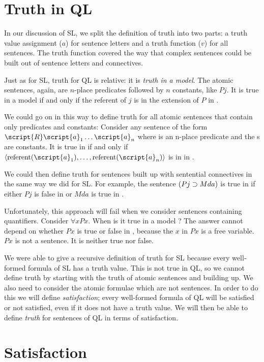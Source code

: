 \section{Truth in QL}
\label{sec.TruthInQL}
In our discussion of SL, we split the definition of truth into two parts: a truth value assignment ($a$) for sentence letters and a truth function ($v$) for all sentences. The truth function covered the way that complex sentences could be built out of sentence letters and connectives.

Just as for SL, truth for QL is relative: it is \emph{truth in a model}. The atomic sentences, again, are $n$-place predicates followed by $n$ constants, like $Pj$. It is true in a model  if and only if the referent of $j$ is in the extension of $P$ in .

We could go on in this way to define truth for all atomic sentences that contain only predicates and constants: Consider any sentence of the form $\script{R}\script{a}_1\ldots\script{a}_n$ where  is an n-place predicate and the s are constants. It is true in  if and only if ${\langle}\referent{\script{a}_1},\ldots,\referent{\script{a}_n}{\rangle}$ is in  in .

We could then define truth for sentences built up with sentential connectives in the same way we did for SL. For example, the sentence $(Pj \supset Mda)$ is true in  if either $Pj$ is false in  or $Mda$ is true in .

Unfortunately, this approach will fail when we consider sentences containing quantifiers. Consider $\forall x Px$. When is it true in a model ? The answer cannot depend on whether $Px$ is true or false in , because the $x$ in $Px$ is a free variable. $Px$ is not a sentence. It is neither true nor false.

We were able to give a recursive definition of truth for SL because every well-formed formula of SL has a truth value. This is not true in QL, so we cannot define truth by starting with the truth of atomic sentences and building up. We also need to consider the atomic formulae which are not sentences. In order to do this we will define \emph{satisfaction}; every well-formed formula of QL will be satisfied or not satisfied, even if it does not have a truth value. We will then be able to define \emph{truth} for sentences of QL in terms of satisfaction.


\section{Satisfaction}


